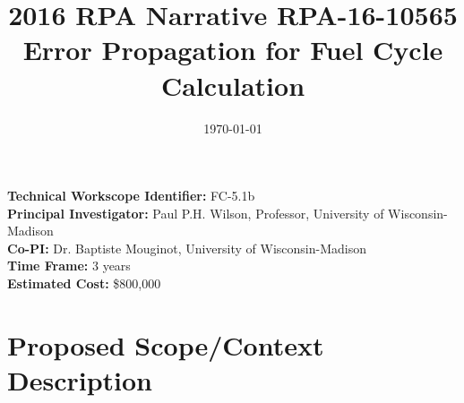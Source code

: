 \documentclass[dvips,12pt]{article}
\title{2016 RPA Narrative RPA-16-10565\\
Error Propagation for Fuel Cycle Calculation}
\date{\today}
\begin{document}
\maketitle 



\noindent\textbf{Technical Workscope Identifier:} FC-5.1b\\
\textbf{Principal Investigator:} Paul P.H. Wilson, Professor, University of Wisconsin-Madison\\
\textbf{Co-PI:} Dr. Baptiste Mouginot, University of Wisconsin-Madison\\
\textbf{Time Frame:} 3 years\\
\textbf{Estimated Cost:} \$800,000\\


\section{Proposed Scope/Context Description}
\end{document}
